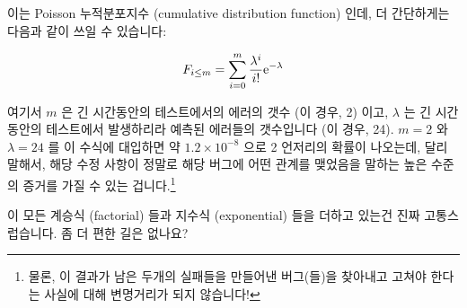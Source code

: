 이는 Poisson 누적분포지수 (cumulative distribution function) 인데, 더
간단하게는 다음과 같이 쓰일 수 있습니다:

\begin{equation}
	F_{i \le m} = \sum_{i=0}^m \frac{\lambda^i}{i!} \mathrm{e}^{-\lambda}
\label{eq:debugging:Possion CDF}
\end{equation}

여기서 $m$ 은 긴 시간동안의 테스트에서의 에러의 갯수 (이 경우, 2) 이고,
$\lambda$ 는 긴 시간동안의 테스트에서 발생하리라 예측된 에러들의 갯수입니다 (이
경우, 24).
$m=2$ 와 $\lambda=24$ 를 이 수식에 대입하면 약 $1.2 \times 10^{-8}$ 으로 2
언저리의 확률이 나오는데, 달리 말해서, 해당 수정 사항이 정말로 해당 버그에 어떤
관계를 맺었음을 말하는 높은 수준의 증거를 가질 수 있는 겁니다.\footnote{
	물론, 이 결과가 남은 두개의 실패들을 만들어낸 버그(들)을 찾아내고
	고쳐야 한다는 사실에 대해 변명거리가 되지 않습니다!}

\QuickQuiz{}
	이 모든 계승식 (factorial) 들과 지수식 (exponential) 들을 더하고 있는건
	진짜 고통스럽습니다.
	좀 더 편한 길은 없나요?
	\iffalse

